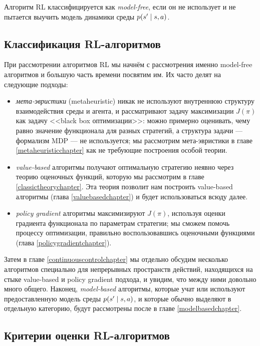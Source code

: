 \begin{definition}
Алгоритм RL классифицируется как \emph{model-free}, если он не использует и не пытается выучить модель динамики среды $p(s' \HM\mid s, a)$. 
\end{definition}

\subsection{Классификация RL-алгоритмов}

При рассмотрении алгоритмов RL мы начнём с рассмотрения именно model-free алгоритмов и большую часть времени посвятим им. Их часто делят на следующие подходы:
\begin{itemize}
    \item \emph{мета-эвристики} (metaheuristic) никак не используют внутреннюю структуру взаимодействия среды и агента, и рассматривают задачу максимизации $J(\pi)$ как задачу <<black box оптимизации>>: можно примерно оценивать, чему равно значение функционала для разных стратегий, а структура задачи --- формализм MDP --- не используется; мы рассмотрим мета-эвристики в главе \ref{metaheuristicchapter} как не требующие построения особой теории. 
    \item \emph{value-based} алгоритмы получают оптимальную стратегию неявно через теорию оценочных функций, которую мы рассмотрим в главе \ref{classictheorychapter}. Эта теория позволит нам построить value-based алгоритмы (глава \ref{valuebasedchapter}) и будет использоваться всюду далее.
    \item \emph{policy gradient} алгоритмы максимизируют $J(\pi)$, используя оценки градиента функционала по параметрам стратегии; мы сможем помочь процессу оптимизации, правильно воспользовавшись оценочными функциями (глава \ref{policygradientchapter}).
\end{itemize}

Затем в главе \ref{continuouscontrolchapter} мы отдельно обсудим несколько алгоритмов специально для непрерывных пространств действий, находящихся на стыке value-based и policy gradient подхода, и увидим, что между ними довольно много общего. Наконец, \emph{model-based} алгоритмы, которые учат или используют предоставленную модель среды $p(s' \HM\mid s, a)$, и которые обычно выделяют в отдельную категорию, будут рассмотрены после в главе \ref{modelbasedchapter}.

\subsection{Критерии оценки RL-алгоритмов}

